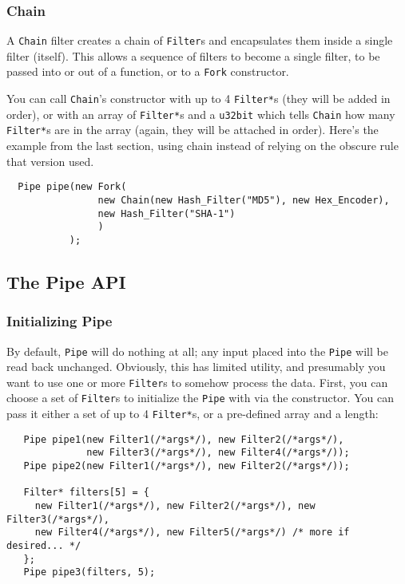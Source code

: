 \documentclass{article}
\newcommand{\type}[1]{\texttt{#1}}
\begin{document}
\subsubsection{Chain}

A \type{Chain} filter creates a chain of \type{Filter}s and
encapsulates them inside a single filter (itself). This allows a
sequence of filters to become a single filter, to be passed into or
out of a function, or to a \type{Fork} constructor.

You can call \type{Chain}'s constructor with up to 4 \type{Filter*}s
(they will be added in order), or with an array of \type{Filter*}s and
a \type{u32bit} which tells \type{Chain} how many \type{Filter*}s are
in the array (again, they will be attached in order). Here's the
example from the last section, using chain instead of relying on the
obscure rule that version used.

\begin{verbatim}
  Pipe pipe(new Fork(
                new Chain(new Hash_Filter("MD5"), new Hex_Encoder),
                new Hash_Filter("SHA-1")
                )
           );
\end{verbatim}

\subsection{The Pipe API}

\subsubsection{Initializing Pipe}

By default, \type{Pipe} will do nothing at all; any input placed into
the \type{Pipe} will be read back unchanged. Obviously, this has
limited utility, and presumably you want to use one or more
\type{Filter}s to somehow process the data. First, you can choose a
set of \type{Filter}s to initialize the \type{Pipe} with via the
constructor. You can pass it either a set of up to 4 \type{Filter*}s,
or a pre-defined array and a length:

\begin{verbatim}
   Pipe pipe1(new Filter1(/*args*/), new Filter2(/*args*/),
              new Filter3(/*args*/), new Filter4(/*args*/));
   Pipe pipe2(new Filter1(/*args*/), new Filter2(/*args*/));

   Filter* filters[5] = {
     new Filter1(/*args*/), new Filter2(/*args*/), new Filter3(/*args*/),
     new Filter4(/*args*/), new Filter5(/*args*/) /* more if desired... */
   };
   Pipe pipe3(filters, 5);
\end{verbatim}
\end{document}
